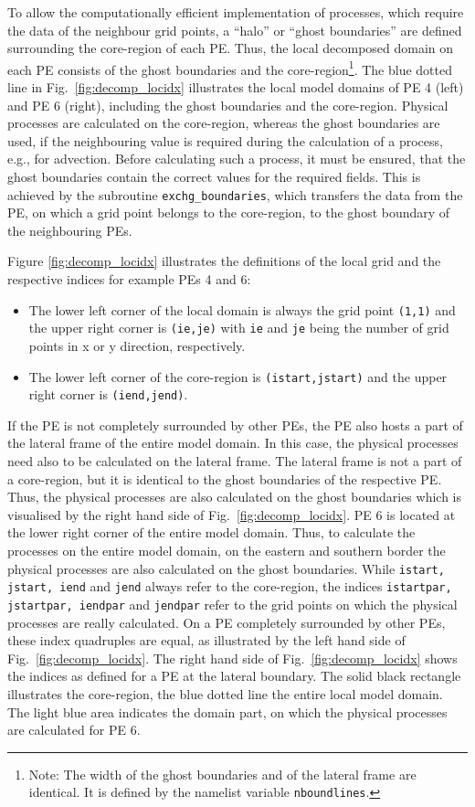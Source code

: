 \documentclass[11pt,twoside]{article}
\begin{document}
To allow the computationally efficient  implementation of  processes, 
which require the data of the neighbour grid points, a ``halo'' or
 ``ghost boundaries'' are defined surrounding the core-region of each PE.
Thus, the local decomposed domain on each PE consists of the ghost boundaries
 and the core-region\footnote{Note: The width of the ghost boundaries and
of the lateral frame are identical. It is defined by the namelist variable 
{\tt nboundlines}.}.
The blue dotted line in Fig.\ \ref{fig:decomp_locidx} illustrates the 
local model domains of PE 4 (left) and PE 6 (right), including the ghost 
boundaries and the core-region.
Physical processes are calculated on the core-region,
whereas the ghost boundaries are used, if the neighbouring value is required
during the calculation of a process, e.g., for advection.
Before calculating such a process, it must be ensured, that the ghost boundaries
contain the correct values for the required fields.
This is achieved by the subroutine \verb|exchg_boundaries|, which transfers the
data from the PE, on which a grid point belongs to the core-region, to the
ghost boundary of the neighbouring PEs.

Figure \ref{fig:decomp_locidx} illustrates the definitions of the local grid and
the respective indices for example PEs 4 and 6:
\begin{itemize}
\item The lower left corner of the local domain is always the grid point 
\verb|(1,1)| and the upper right 
corner is \verb|(ie,je)| with \verb|ie| and \verb|je| being the number of 
grid points in x or y direction, respectively. 
\item The lower left corner of the core-region is \verb|(istart,jstart)|
 and the upper right corner is \verb|(iend,jend)|.
\end{itemize}
 If the PE is not completely surrounded by other PEs, the PE also hosts 
a part of the lateral frame of the entire model domain. In this case, the 
physical processes need also to be calculated on the lateral frame. The lateral
frame is not a part of a core-region, but it is identical to the ghost boundaries
of the respective PE. Thus, the physical processes are also calculated on the
ghost boundaries which is visualised by the right hand side of Fig.\ 
\ref{fig:decomp_locidx}. PE 6 is located at the lower right corner of the
entire model domain. Thus, to calculate the processes on the entire model 
domain, on the eastern and southern border the physical processes are also 
calculated on the ghost boundaries.
While \verb|istart, jstart, iend| and \verb|jend| always refer to the 
core-region, the indices \verb|istartpar, jstartpar, iendpar| and \verb|jendpar|
 refer to the
grid points on which the physical processes are really calculated. On a
PE completely surrounded by other PEs, these index quadruples are equal, as 
illustrated by the left hand side of Fig.\ \ref{fig:decomp_locidx}. 
The right hand side of  Fig.\ \ref{fig:decomp_locidx} shows the indices as 
defined for a PE at the lateral boundary. 
The solid black rectangle illustrates the core-region, the blue dotted line
the entire local model domain. The light blue area indicates the
domain part, on which the physical processes are calculated for PE 6. 
\end{document}
